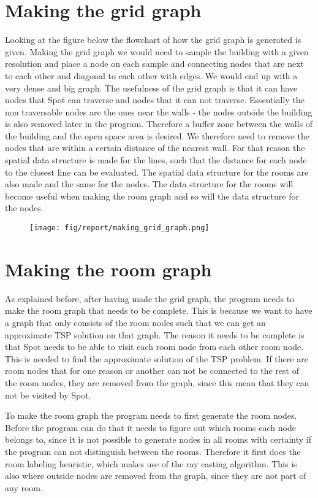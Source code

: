 \section{Making the grid graph}
Looking at the figure below the flowchart of how the grid graph is generated is given. Making the grid graph we would need to sample the building with a given resolution and place a node on each sample and connecting nodes that are next to each other and diagonal to each other with edges. We would end up with a very dense and big graph. The usefulness of the grid graph is that it can have nodes that Spot can traverse and nodes that it can not traverse. Essentially the non traversable nodes are the ones near the walls - the nodes outside the building is also removed later in the program. Therefore a buffer zone between the walls of the building and the open space area is desired. We therefore need to remove the nodes that are within a certain distance of the nearest wall. For that reason the spatial data structure is made for the lines, such that the distance for each node to the closest line can be evaluated. The spatial data structure for the rooms are also made and the same for the nodes. The data structure for the rooms will become useful when making the room graph and so will the data structure for the nodes.

\begin{figure}[H]
    \centering
    \texttt{[image: fig/report/making\_grid\_graph.png]}
    \label{}
    \caption[Design overview]{}
\end{figure}


\section{Making the room graph}
As explained before, after having made the grid graph, the program needs to make the room graph that needs to be complete. This is because we want to have a graph that only consists of the room nodes such that we can get an approximate TSP solution on that graph. The reason it needs to be complete is that Spot needs to be able to visit each room node from each other room node. This is needed to find the approximate solution of the TSP problem. If there are room nodes that for one reason or another can not be connected to the rest of the room nodes, they are removed from the graph, since this mean that they can not be visited by Spot.

To make the room graph the program needs to first generate the room nodes. Before the program can do that it needs to figure out which rooms each node belongs to, since it is not possible to generate nodes in all rooms with certainty if the program can not distinguish between the rooms. Therefore it first does the room labeling heuristic, which makes use of the ray casting algorithm. This is also where outside nodes are removed from the graph, since they are not part of any room.

